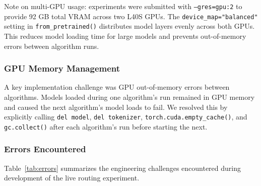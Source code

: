 \documentclass[12pt]{article}
\begin{document}
Note on multi-GPU usage: experiments were submitted with
\texttt{--gres=gpu:2} to provide 92 GB total VRAM across two L40S GPUs.
The \texttt{device\_map="balanced"} setting in \texttt{from\_pretrained()}
distributes model layers evenly across both GPUs. This reduces model loading
time for large models and prevents out-of-memory errors between algorithm
runs.

\subsubsection{GPU Memory Management}

A key implementation challenge was GPU out-of-memory errors between
algorithms. Models loaded during one algorithm's run remained in GPU memory
and caused the next algorithm's model loads to fail. We resolved this by
explicitly calling \texttt{del model}, \texttt{del tokenizer},
\texttt{torch.cuda.empty\_cache()}, and \texttt{gc.collect()} after each
algorithm's run before starting the next.

\subsubsection{Errors Encountered}

Table~\ref{tab:errors} summarizes the engineering challenges encountered
during development of the live routing experiment.
\end{document}
